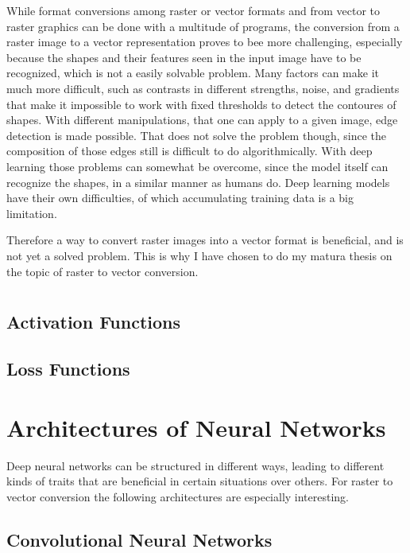 \documentclass[12pt, a4paper, titlepage]{report}
\begin{document}
While format conversions among raster or vector formats and from vector to raster graphics can be done with a multitude of programs, the conversion from a raster image to a vector representation proves to bee more challenging, especially because the shapes and their features seen in the input image have to be recognized, which is not a easily solvable problem. Many factors can make it much more difficult, such as contrasts in different strengths, noise, and gradients that make it impossible to work with fixed thresholds to detect the contoures of shapes. With different manipulations, that one can apply to a given image, edge detection is made possible. That does not solve the problem though, since the composition of those edges still is difficult to do algorithmically.
With deep learning those problems can somewhat be overcome, since the model itself can recognize the shapes, in a similar manner as humans do. Deep learning models have their own difficulties, of which accumulating training data is a big limitation.

Therefore a way to convert raster images into a vector format is beneficial, and is not yet a solved problem. This is why I have chosen to do my matura thesis on the topic of raster to vector conversion.


\pagebreak

\section{}
\subsection{Activation Functions}
\subsection{Loss Functions}

\section{Architectures of Neural Networks}

Deep neural networks can be structured in different ways, leading to different kinds of traits that are beneficial in certain situations over others. For raster to vector conversion the following architectures are especially interesting.

\subsection{Convolutional Neural Networks}
\end{document}
